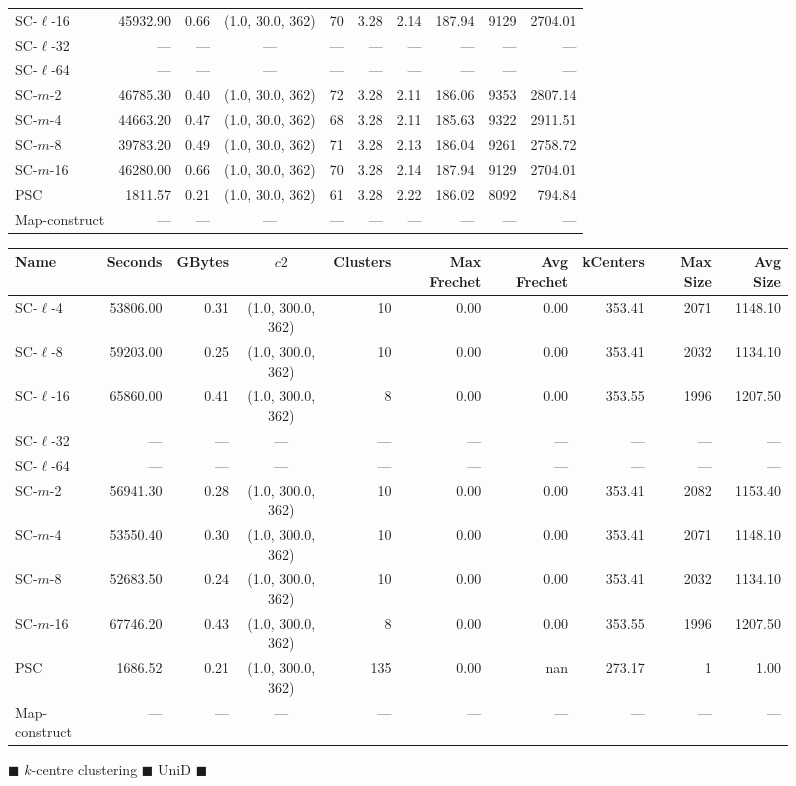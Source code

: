 \begin{figure}
\begin{center}
\begin{minipage}{\textwidth}
{\begin{tabular}{@{}lrrcrrrrrr@{}}
    SC-$\ell$-16 & 45932.90 & 0.66 & (1.0, 30.0, 362) & 70 & 3.28 & 2.14 & 187.94 & 9129 & 2704.01\\
    SC-$\ell$-32 & --- & --- & --- & --- & --- & --- & --- & --- & ---\\
    SC-$\ell$-64 & --- & --- & --- & --- & --- & --- & --- & --- & ---\\
    SC-$m$-2 & 46785.30 & 0.40 & (1.0, 30.0, 362) & 72 & 3.28 & 2.11 & 186.06 & 9353 & 2807.14\\
    SC-$m$-4 & 44663.20 & 0.47 & (1.0, 30.0, 362) & 68 & 3.28 & 2.11 & 185.63 & 9322 & 2911.51\\
    SC-$m$-8 & 39783.20 & 0.49 & (1.0, 30.0, 362) & 71 & 3.28 & 2.13 & 186.04 & 9261 & 2758.72\\
    SC-$m$-16 & 46280.00 & 0.66 & (1.0, 30.0, 362) & 70 & 3.28 & 2.14 & 187.94 & 9129 & 2704.01\\
    PSC & 1811.57 & 0.21 & (1.0, 30.0, 362) & 61 & 3.28 & 2.22 & 186.02 & 8092 & 794.84\\
    Map-construct & --- & --- & --- & --- & --- & --- & --- & --- & ---\\
    \bottomrule
\end{tabular}
}
{
\begin{tabular}{@{}lrrcrrrrrr@{}}
    \toprule
    Name & Seconds & GBytes & $c2$ & Clusters & Max Frechet & Avg Frechet & kCenters & Max Size & Avg Size\\
    \midrule
    SC-$\ell$-4 & 53806.00 & 0.31 & (1.0, 300.0, 362) & 10 & 0.00 & 0.00 & 353.41 & 2071 & 1148.10\\
    SC-$\ell$-8 & 59203.00 & 0.25 & (1.0, 300.0, 362) & 10 & 0.00 & 0.00 & 353.41 & 2032 & 1134.10\\
    SC-$\ell$-16 & 65860.00 & 0.41 & (1.0, 300.0, 362) & 8 & 0.00 & 0.00 & 353.55 & 1996 & 1207.50\\
    SC-$\ell$-32 & --- & --- & --- & --- & --- & --- & --- & --- & ---\\
    SC-$\ell$-64 & --- & --- & --- & --- & --- & --- & --- & --- & ---\\
    SC-$m$-2 & 56941.30 & 0.28 & (1.0, 300.0, 362) & 10 & 0.00 & 0.00 & 353.41 & 2082 & 1153.40\\
    SC-$m$-4 & 53550.40 & 0.30 & (1.0, 300.0, 362) & 10 & 0.00 & 0.00 & 353.41 & 2071 & 1148.10\\
    SC-$m$-8 & 52683.50 & 0.24 & (1.0, 300.0, 362) & 10 & 0.00 & 0.00 & 353.41 & 2032 & 1134.10\\
    SC-$m$-16 & 67746.20 & 0.43 & (1.0, 300.0, 362) & 8 & 0.00 & 0.00 & 353.55 & 1996 & 1207.50\\
    PSC & 1686.52 & 0.21 & (1.0, 300.0, 362) & 135 & 0.00 & nan & 273.17 & 1 & 1.00\\
    Map-construct & --- & --- & --- & --- & --- & --- & --- & --- & ---\\
    \bottomrule
\end{tabular}
}
\end{minipage}
\end{center}
    \caption{$\blacksquare$ $k$-centre clustering $\blacksquare$ UniD $\blacksquare$}
\end{figure}
